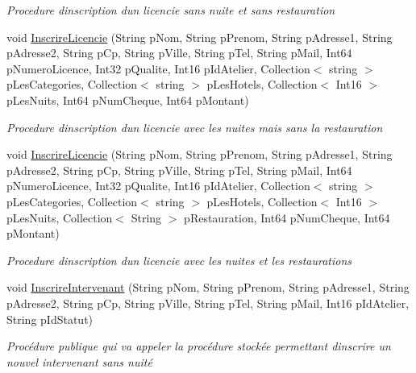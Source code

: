 \begin{DoxyCompactItemize}
\begin{DoxyCompactList}\small\item\em Procedure d\textquotesingle{}inscription d\textquotesingle{}un licencie sans nuite et sans restauration \end{DoxyCompactList}\item 
void \hyperlink{class_base_de_donnees_1_1_bdd_af80619478c0d65bc2044a6add59195c6}{Inscrire\+Licencie} (String p\+Nom, String p\+Prenom, String p\+Adresse1, String p\+Adresse2, String p\+Cp, String p\+Ville, String p\+Tel, String p\+Mail, Int64 p\+Numero\+Licence, Int32 p\+Qualite, Int16 p\+Id\+Atelier, Collection$<$ string $>$ p\+Les\+Categories, Collection$<$ string $>$ p\+Les\+Hotels, Collection$<$ Int16 $>$ p\+Les\+Nuits, Int64 p\+Num\+Cheque, Int64 p\+Montant)
\begin{DoxyCompactList}\small\item\em Procedure d\textquotesingle{}inscription d\textquotesingle{}un licencie avec les nuites mais sans la restauration \end{DoxyCompactList}\item 
void \hyperlink{class_base_de_donnees_1_1_bdd_a4ba18acfc209c903383908ad94ee83b9}{Inscrire\+Licencie} (String p\+Nom, String p\+Prenom, String p\+Adresse1, String p\+Adresse2, String p\+Cp, String p\+Ville, String p\+Tel, String p\+Mail, Int64 p\+Numero\+Licence, Int32 p\+Qualite, Int16 p\+Id\+Atelier, Collection$<$ string $>$ p\+Les\+Categories, Collection$<$ string $>$ p\+Les\+Hotels, Collection$<$ Int16 $>$ p\+Les\+Nuits, Collection$<$ String $>$ p\+Restauration, Int64 p\+Num\+Cheque, Int64 p\+Montant)
\begin{DoxyCompactList}\small\item\em Procedure d\textquotesingle{}inscription d\textquotesingle{}un licencie avec les nuites et les restaurations \end{DoxyCompactList}\item 
void \hyperlink{class_base_de_donnees_1_1_bdd_abfbf2eb771a5e60ef361d5d9fc00304f}{Inscrire\+Intervenant} (String p\+Nom, String p\+Prenom, String p\+Adresse1, String p\+Adresse2, String p\+Cp, String p\+Ville, String p\+Tel, String p\+Mail, Int16 p\+Id\+Atelier, String p\+Id\+Statut)
\begin{DoxyCompactList}\small\item\em Procédure publique qui va appeler la procédure stockée permettant d\textquotesingle{}inscrire un nouvel intervenant sans nuité \end{DoxyCompactList}\item 

\end{DoxyCompactItemize}
